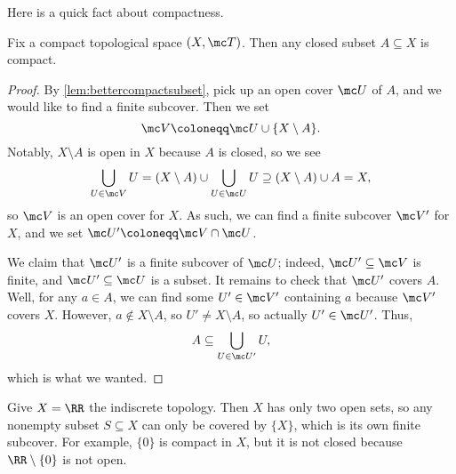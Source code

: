 \documentclass[../notes.tex]{subfiles}
\begin{document}
Here is a quick fact about compactness.
\begin{lemma} \label{lem:closedincompactiscompact}
	Fix a compact topological space $(X,\mc T)$. Then any closed subset $A\subseteq X$ is compact.
\end{lemma}
\begin{proof}
	By \autoref{lem:bettercompactsubset}, pick up an open cover $\mc U$ of $A$, and we would like to find a finite subcover. Then we set
	\[\mc V\coloneqq\mc U\cup\{X\setminus A\}.\]
	Notably, $X\setminus A$ is open in $X$ because $A$ is closed, so we see
	\[\bigcup_{U\in\mc V}U=(X\setminus A)\cup\bigcup_{U\in\mc U}U\supseteq(X\setminus A)\cup A=X,\]
	so $\mc V$ is an open cover for $X$. As such, we can find a finite subcover $\mc V'$ for $X$, and we set $\mc U'\coloneqq\mc V\cap\mc U$.
	
	We claim that $\mc U'$ is a finite subcover of $\mc U$; indeed, $\mc U'\subseteq\mc V$ is finite, and $\mc U'\subseteq\mc U$ is a subset. It remains to check that $\mc U'$ covers $A$. Well, for any $a\in A$, we can find some $U'\in\mc V'$ containing $a$ because $\mc V'$ covers $X$. However, $a\notin X\setminus A$, so $U'\ne X\setminus A$, so actually $U'\in\mc U'$. Thus,
	\[A\subseteq\bigcup_{U\in\mc U'}U,\]
	which is what we wanted.
\end{proof}
\begin{example} \label{ex:compactnotclosed}
	Give $X=\RR$ the indiscrete topology. Then $X$ has only two open sets, so any nonempty subset $S\subseteq X$ can only be covered by $\{X\}$, which is its own finite subcover. For example, $\{0\}$ is compact in $X$, but it is not closed because $\RR\setminus\{0\}$ is not open.
\end{example}
\end{document}

